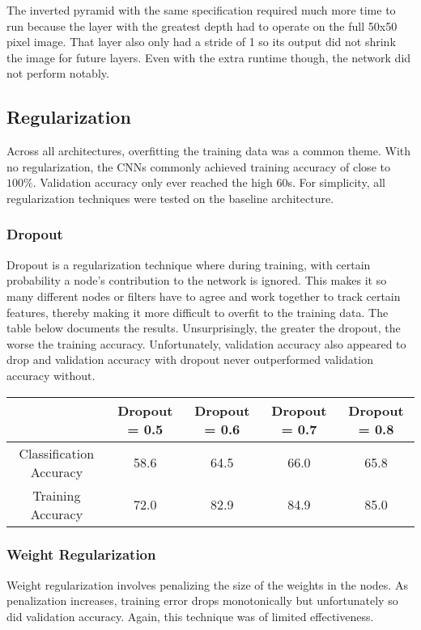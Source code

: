 \documentclass[10pt,twoside]{article}
\begin{document}
The inverted pyramid with the same specification required much more time to run because the layer with the greatest depth had to operate on the full 50x50 pixel image. That layer also only had a stride of 1 so its output did not shrink the image for future layers. Even with the extra runtime though, the network did not perform notably.

\subsection{Regularization}
Across all architectures, overfitting the training data was a common theme. With no regularization, the CNNs commonly achieved training accuracy of close to $100\%$. Validation accuracy only ever reached the high 60s. For simplicity, all regularization techniques were tested on the baseline architecture.

\subsubsection{Dropout}
Dropout is a regularization technique where during training, with certain probability a node's contribution to the network is ignored. This makes it so many different nodes or filters have to agree and work together to track certain features, thereby making it more difficult to overfit to the training data. The table below documents the results. Unsurprisingly, the greater the dropout, the worse the training accuracy. Unfortunately, validation accuracy also appeared to drop and validation accuracy with dropout never outperformed validation accuracy without.

\begin{center}
 \begin{tabular}{||c c c c c||} 
 \hline
  & Dropout = 0.5 & Dropout = 0.6 & Dropout = 0.7  & Dropout = 0.8 \\ [0.5ex] 
 \hline\hline
 Classification Accuracy & 58.6 & 64.5 & 66.0 & 65.8 \\ 
 \hline
 Training Accuracy       & 72.0 & 82.9 & 84.9 & 85.0 \\
 \hline
\end{tabular}
\end{center}


\subsubsection{Weight Regularization}
Weight regularization involves penalizing the size of the weights in the nodes. As penalization increases, training error drops monotonically but unfortunately so did validation accuracy. Again, this technique was of limited effectiveness. 
\end{document}
